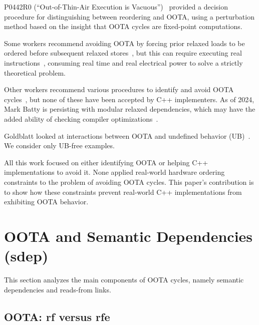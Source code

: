 P0442R0 (``Out-of-Thin-Air Execution is Vacuous'')~\cite{PaulEMcKenney2016OOTA}
provided a decision procedure for distinguishing between reordering and
OOTA, using a perturbation method based on the insight that OOTA cycles
are fixed-point computations.

Some workers recommend avoiding OOTA by forcing prior relaxed
loads to be ordered before subsequent relaxed
stores~\cite{Boehm:2014:OGA:2618128.2618134,HansBoehm2019OOTArevisitedAgain,Lahav:2017:RSC:3062341.3062352},
but this can require executing real
instructions~\cite[Section 7.1]{Maranget2012TutorialARMPower},
consuming real time and real electrical power to solve a strictly
theoretical problem.

Other workers recommend various procedures to identify and avoid OOTA
cycles~\cite{Lahav:2017:RSC:3062341.3062352,Sinclair:2017:CAR:3079856.3080206,Lee:10.1145/3385412.3386010,MarkBatty2019ModularRelaxedDependenciesOOTA},
but none of these have been accepted by C++ implementers.
As of 2024, Mark Batty is persisting with modular relaxed dependencies,
which may have the added ability of checking compiler
optimizations~\cite{JayRichards2024SymbolicMrder}.

Goldblatt looked at interactions between OOTA and
undefined behavior (UB)~\cite{DavidGoldblatt2019NoElegantOOTAfix}.
We consider only UB-free examples.

All this work focused on either identifying OOTA or helping C++
implementations to avoid it.
None applied real-world hardware ordering constraints to the problem
of avoiding OOTA cycles.
This paper's contribution is to show how these constraints prevent
real-world C++ implementations from exhibiting OOTA behavior.

\section{OOTA and Semantic Dependencies (sdep)}
\label{sec:OOTA and Semantic Dependencies (sdep)}

This section analyzes the main components of OOTA cycles, namely
semantic dependencies and reads-from links.

\subsection{OOTA: rf versus rfe}
\label{sec:OOTA: rf versus rfe}

